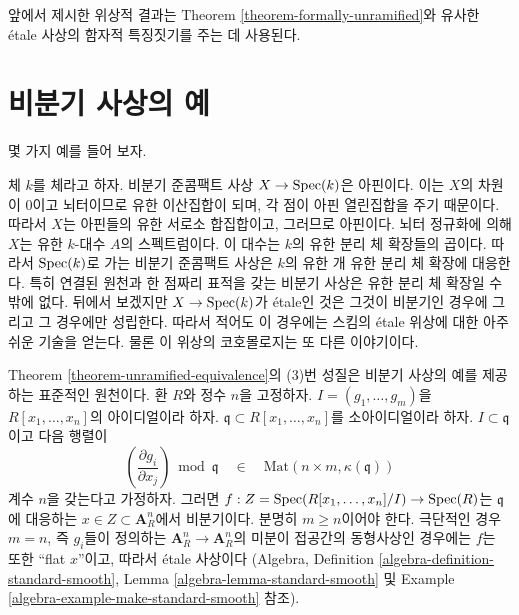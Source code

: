 \noindent
앞에서 제시한 위상적 결과는 Theorem
\ref{theorem-formally-unramified}와 유사한 \'etale 사상의 함자적
특징짓기를 주는 데 사용된다.


\section{비분기 사상의 예}
\label{section-examples}

\noindent
몇 가지 예를 들어 보자.

\begin{example}
\label{example-etale-field-extensions}
체 $k$를 체라고 하자.
비분기 준콤팩트 사상 $X \to \mathop{\mathrm{Spec}}(k)$은 아핀이다.
이는 $X$의 차원이 $0$이고 뇌터이므로 유한 이산집합이 되며,
각 점이 아핀 열린집합을 주기 때문이다. 따라서 $X$는 아핀들의
유한 서로소 합집합이고, 그러므로 아핀이다.
뇌터 정규화에 의해 $X$는 유한 $k$-대수 $A$의 스펙트럼이다.
이 대수는 $k$의 유한 분리 체 확장들의 곱이다.
따라서 $\mathop{\mathrm{Spec}}(k)$로 가는 비분기 준콤팩트 사상은
$k$의 유한 개 유한 분리 체 확장에 대응한다.
특히 연결된 원천과 한 점짜리 표적을 갖는 비분기 사상은
유한 분리 체 확장일 수밖에 없다.
뒤에서 보겠지만 $X \to \mathop{\mathrm{Spec}}(k)$가 \'etale인 것은
그것이 비분기인 경우에 그리고 그 경우에만 성립한다.
따라서 적어도 이 경우에는 스킴의 \'etale 위상에 대한
아주 쉬운 기술을 얻는다. 물론 이 위상의 코호몰로지는
또 다른 이야기이다.
\end{example}

\begin{example}
\label{example-standard-etale}
Theorem \ref{theorem-unramified-equivalence}의 (3)번 성질은
비분기 사상의 예를 제공하는 표준적인 원천이다.
환 $R$와 정수 $n$을 고정하자. $I = (g_1, \ldots, g_m)$을
$R[x_1, \ldots, x_n]$의 아이디얼이라 하자.
$\mathfrak q \subset R[x_1, \ldots, x_n]$를 소아이디얼이라 하자.
$I \subset \mathfrak q$이고 다음 행렬이
$$
\left(\frac{\partial g_i}{\partial x_j}\right) \bmod \mathfrak q
\quad\in\quad
\text{Mat}(n \times m, \kappa(\mathfrak q))
$$
계수 $n$을 갖는다고 가정하자. 그러면
$f : Z = \mathop{\mathrm{Spec}}(R[x_1, \ldots, x_n]/I) \to \mathop{\mathrm{Spec}}(R)$는
$\mathfrak q$에 대응하는 $x \in Z \subset \mathbf{A}^n_R$에서
비분기이다. 분명히 $m \geq n$이어야 한다.
극단적인 경우 $m = n$, 즉 $g_i$들이 정의하는
$\mathbf{A}^n_R \to \mathbf{A}^n_R$의 미분이 접공간의
동형사상인 경우에는 $f$는 또한 “flat $x$”이고, 따라서
\'etale 사상이다 (Algebra, Definition
\ref{algebra-definition-standard-smooth},
Lemma \ref{algebra-lemma-standard-smooth} 및
Example \ref{algebra-example-make-standard-smooth} 참조).
\end{example}

